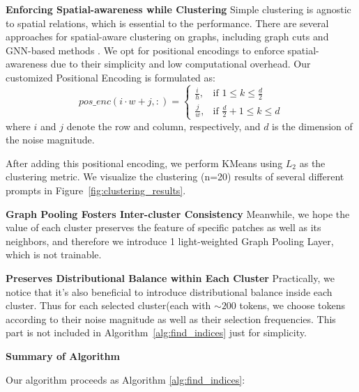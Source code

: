 \documentclass[10pt]{article}
\begin{document}
\textbf{Enforcing Spatial-awareness while Clustering}
Simple clustering is agnostic to spatial relations, which is essential to the performance. There are several approaches for spatial-aware clustering on graphs, including graph cuts \citep{Shi1997NormalizedCA} and GNN-based methods \citep{bianchi2020mincutpool}. We opt for positional encodings to enforce spatial-awareness due to their simplicity and low computational overhead.
Our customized Positional Encoding is formulated as:
\begin{equation}
    \label{eq::3}
    {pos\_enc}(i \cdot w + j, :) = \begin{cases} 
\frac{i}{h}, & \text{if } 1 \leq k \leq \frac{d}{2} \\
\frac{j}{w}, & \text{if } \frac{d}{2} + 1 \leq k \leq d
    \end{cases}
\end{equation}
where $i$ and $j$ denote the row and column, respectively, and $d$ is the dimension of the noise magnitude.

After adding this positional encoding, we perform KMeans \citep{MacQueen1967SomeMF} using $L_2$ as the clustering metric. We visualize the clustering (n=20) results of several different prompts in Figure~\ref{fig:clustering_results}.



\textbf{Graph Pooling Fosters Inter-cluster Consistency}
Meanwhile, we hope the value of each cluster preserves the feature of specific patches as well as its neighbors, and therefore we introduce 1 light-weighted Graph Pooling Layer, which is not trainable.

\textbf{Preserves Distributional Balance within Each Cluster}
Practically, we notice that it's also beneficial to introduce distributional balance inside each cluster. Thus for each selected cluster(each with $\sim 200$ tokens, we choose tokens according to their noise magnitude as well as their selection frequencies. This part is not included in Algorithm~\ref{alg:find_indices} just for simplicity.

\textbf{Summary of Algorithm}

Our algorithm proceeds as Algorithm \ref{alg:find_indices}:
\end{document}
